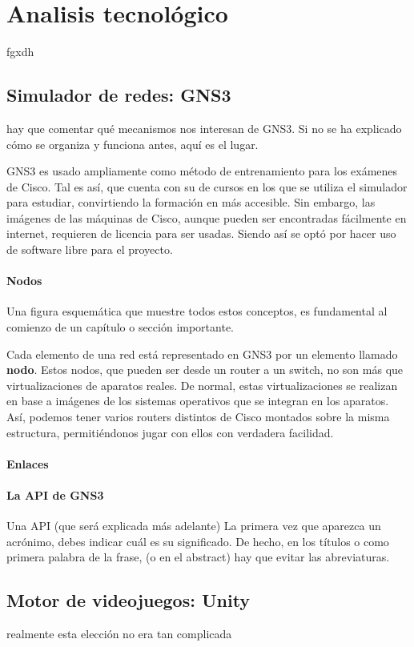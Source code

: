 \chapter{Analisis tecnológico}\label{chap:Analisis}

fgxdh

\section{Simulador de redes: GNS3}
hay que comentar qué mecanismos nos interesan de GNS3. Si no se ha explicado cómo se organiza y funciona antes, aquí es el lugar.

GNS3 es usado ampliamente como método de entrenamiento para los exámenes de Cisco. Tal es así, que cuenta con su  de cursos en los que se utiliza el simulador para estudiar, convirtiendo la formación en más accesible. Sin embargo, las imágenes de las máquinas de Cisco, aunque pueden ser encontradas fácilmente en internet, requieren de licencia para ser usadas. Siendo así se optó por hacer uso de software libre para el proyecto. 

\subsubsection{Nodos}
Una figura esquemática que muestre todos estos conceptos, es fundamental al comienzo de un capítulo o sección importante.

Cada elemento de una red está representado en GNS3 por un elemento llamado \textbf{nodo}. Estos nodos, que pueden ser desde un router a un switch, no son más que virtualizaciones de aparatos reales. De normal, estas virtualizaciones se realizan en base a imágenes de los sistemas operativos que se integran en los aparatos. Así, podemos tener varios routers distintos de Cisco montados sobre la misma estructura, permitiéndonos jugar con ellos con verdadera facilidad.

\subsubsection{Enlaces}

\subsubsection{La API de GNS3}
Una API (que será explicada más adelante)
La primera vez que aparezca un acrónimo, debes indicar cuál es su significado. De hecho, en los títulos o como primera palabra de la frase, (o en el abstract) hay que evitar las abreviaturas.


\section{Motor de videojuegos: Unity}
realmente esta elección no era tan complicada